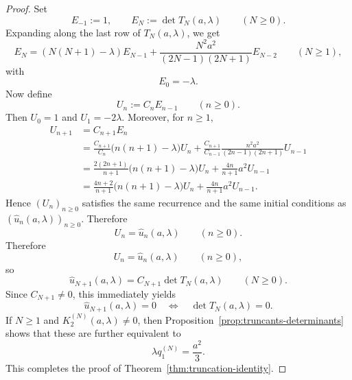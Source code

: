 \documentclass[10pt,a4paper]{amsart}
\begin{document}
\begin{proof}
Set
\[
E_{-1}:=1,
\qquad
E_N:=\det T_N(a,\lambda)
\qquad(N\ge 0).
\]
Expanding along the last row of \(T_N(a,\lambda)\), we get
\[
E_N=(N(N+1)-\lambda)E_{N-1}
+\frac{N^2a^2}{(2N-1)(2N+1)}E_{N-2}
\qquad(N\ge 1),
\]
with
\[
E_0=-\lambda.
\]
Now define
\[
U_n:=C_nE_{n-1}
\qquad(n\ge 0).
\]
Then \(U_0=1\) and \(U_1=-2\lambda\). Moreover, for \(n\ge 1\),
\begin{align*}
U_{n+1}
&=C_{n+1}E_n \\
&=\frac{C_{n+1}}{C_n}\bigl(n(n+1)-\lambda\bigr)U_n
+\frac{C_{n+1}}{C_{n-1}}\frac{n^2a^2}{(2n-1)(2n+1)}U_{n-1} \\
&=\frac{2(2n+1)}{n+1}\bigl(n(n+1)-\lambda\bigr)U_n
+\frac{4n}{n+1}a^2U_{n-1} \\
&=\frac{4n+2}{n+1}\bigl(n(n+1)-\lambda\bigr)U_n
+\frac{4n}{n+1}a^2U_{n-1}.
\end{align*}
Hence \((U_n)_{n\ge 0}\) satisfies the same recurrence and the same initial conditions as
\((\widehat u_n(a,\lambda))_{n\ge 0}\). Therefore
\[
U_n=\widehat u_n(a,\lambda)
\qquad(n\ge 0).
\]
Therefore
\[
U_n=\widehat u_n(a,\lambda)
\qquad(n\ge 0),
\]
so
\[
\widehat u_{N+1}(a,\lambda)=C_{N+1}\det T_N(a,\lambda)
\qquad(N\ge 0).
\]
Since \(C_{N+1}\neq 0\), this immediately yields
\[
\widehat u_{N+1}(a,\lambda)=0
\quad\Longleftrightarrow\quad
\det T_N(a,\lambda)=0.
\]
If \(N\ge 1\) and \(K_2^{(N)}(a,\lambda)\neq 0\), then
Proposition~\ref{prop:truncants-determinants} shows that these are further equivalent to
\[
\lambda q_1^{(N)}=\frac{a^2}{3}.
\]
This completes the proof of Theorem~\ref{thm:truncation-identity}.
\end{proof}
\end{document}
